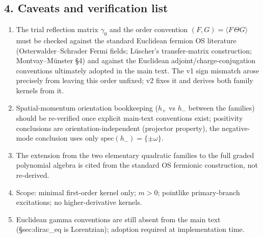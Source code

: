 \subsection*{4. Caveats and verification list}
\begin{enumerate}[label=(\alph*)]
  \item The trial reflection matrix $\gamma_0$ and the order
    convention $(F,G)=\langle F\,\Theta G\rangle$ must be checked
    against the standard Euclidean fermion OS literature
    (Osterwalder--Schrader Fermi fields; L\"uscher's transfer-matrix
    construction; Montvay--M\"unster \S4) and against the Euclidean
    adjoint/charge-conjugation conventions ultimately adopted in
    the main text.
    The v1 sign mismatch arose precisely from leaving this order
    unfixed; v2 fixes it and derives both family kernels from it.
  \item Spatial-momentum orientation bookkeeping
    ($h_+$ vs $h_-$ between the families) should be re-verified
    once explicit main-text conventions exist; positivity
    conclusions are orientation-independent (projector property),
    the negative-mode conclusion uses only
    $\mathrm{spec}(h_-)=\{\pm\omega\}$.
  \item The extension from the two elementary quadratic families to
    the full graded polynomial algebra is cited from the standard
    OS fermionic construction, not re-derived.
  \item Scope: minimal first-order kernel only; $m>0$; pointlike
    primary-branch excitations; no higher-derivative kernels.
  \item Euclidean gamma conventions are still absent from the main
    text (\S sec:dirac\_eq is Lorentzian); adoption required at
    implementation time.
\end{enumerate}
